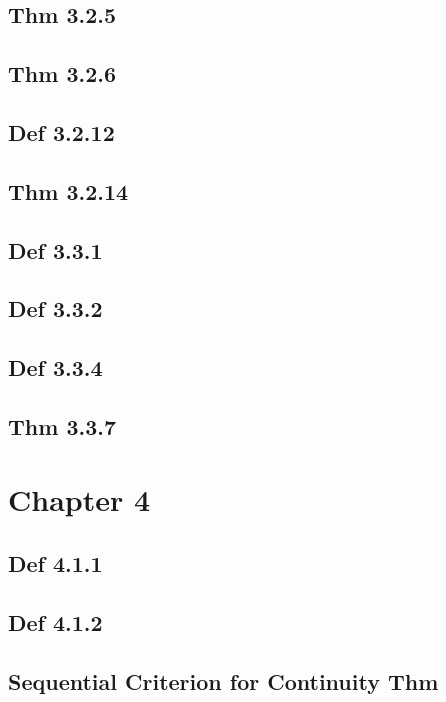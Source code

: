 \subsection*{Thm 3.2.5}

\subsection*{Thm 3.2.6}

\subsection*{Def 3.2.12}

\subsection*{Thm 3.2.14}

\subsection*{Def 3.3.1}

\subsection*{Def 3.3.2}

\subsection*{Def 3.3.4}

\subsection*{Thm 3.3.7}

\section*{Chapter 4}

\subsection*{Def 4.1.1}

\subsection*{Def 4.1.2}

\subsection*{Sequential Criterion for Continuity Thm}

